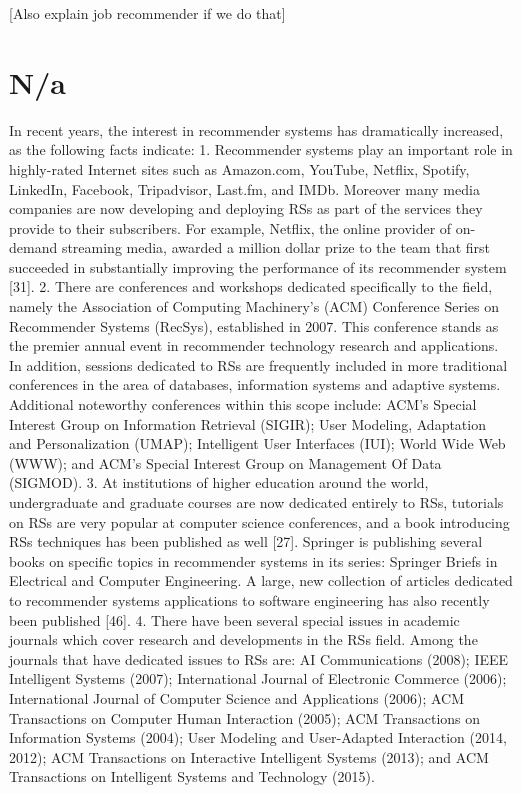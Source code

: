 [Also explain job recommender if we do that]

\section{N/a}

In recent years, the interest in recommender systems has dramatically increased, as the following facts indicate:
1. Recommender systems play an important role in highly-rated Internet sites such as Amazon.com, YouTube, Netflix, Spotify, LinkedIn, Facebook, Tripadvisor, Last.fm, and IMDb. Moreover many media companies are now developing and deploying RSs as part of the services they provide to their subscribers. For example, Netflix, the online provider of on-demand streaming media, awarded a million dollar prize to the team that first succeeded in substantially improving the performance of its recommender system [31].
2. There are conferences and workshops dedicated specifically to the field, namely the Association of Computing Machinery’s (ACM) Conference Series on Recommender Systems (RecSys), established in 2007. This conference stands as the premier annual event in recommender technology research and applications. In addition, sessions dedicated to RSs are frequently included in more traditional conferences in the area of databases, information systems and adaptive systems. Additional noteworthy conferences within this scope include: ACM’s Special Interest Group on Information Retrieval (SIGIR); User Modeling, Adaptation and Personalization (UMAP); Intelligent User Interfaces (IUI); World Wide Web (WWW); and ACM’s Special Interest Group on Management Of Data (SIGMOD).
3. At institutions of higher education around the world, undergraduate and graduate courses are now dedicated entirely to RSs, tutorials on RSs are very popular at computer science conferences, and a book introducing RSs techniques has been published as well [27]. Springer is publishing several books on specific topics in recommender systems in its series: Springer Briefs in Electrical and Computer Engineering. A large, new collection of articles dedicated to recommender systems applications to software engineering has also recently been published [46].
4. There have been several special issues in academic journals which cover research and developments in the RSs field. Among the journals that have dedicated issues to RSs are: AI Communications (2008); IEEE Intelligent Systems (2007); International Journal of Electronic Commerce (2006); International Journal of Computer Science and Applications (2006); ACM Transactions on Computer Human Interaction (2005); ACM Transactions on Information Systems (2004); User Modeling and User-Adapted Interaction (2014, 2012); ACM Transactions on Interactive Intelligent Systems (2013); and ACM Transactions on Intelligent Systems and Technology (2015). ~\parencite{Ricci2015}
